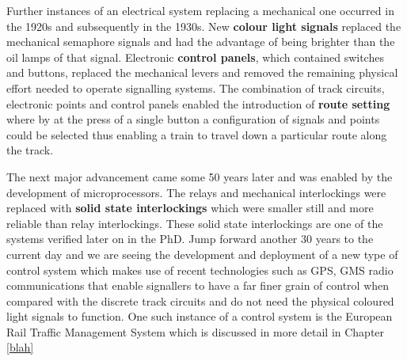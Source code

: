 Further instances of an electrical system replacing a mechanical one occurred in the 1920s and subsequently in the 1930s. New \textbf{colour light signals} replaced  the mechanical semaphore signals and had the advantage of being brighter than the oil lamps of that signal.
Electronic \textbf{control panels}, which contained switches and buttons, replaced the mechanical levers and removed the remaining physical effort needed to operate signalling systems. The combination of track circuits, electronic points and control panels enabled the introduction of \textbf{route setting} where by at the press of a single button a configuration of signals and points could be selected thus enabling a train to travel down a particular route along the track.

The next major advancement came some 50 years later and was enabled by the development of microprocessors. The relays and mechanical interlockings were replaced with \textbf{solid state interlockings} which were smaller still and more reliable than relay interlockings.
These solid state interlockings are one of the systems verified later on in the PhD. Jump forward another 30 years to the current day and we are seeing the development and deployment of a new type of control system which makes use of recent technologies such as GPS, GMS radio  communications that enable signallers to have a far finer grain of control when compared with the discrete track circuits and do not need the physical coloured light signals to function. One such instance of a control system is the European Rail Traffic Management System which is discussed in more detail in Chapter \ref{blah}
\begin{comment}
In the 1920s \textbf{colour light signals} replaced mechanical semaphore signals these where much brighter than the oil
lamps fitted to semaphores and greatly increased the safety of night time
train travel. In the 1930s the mechanical levers were replaced with an electronic \textbf{control panel}
containing switches and buttons. This allowed for the introduction of
\textbf{route setting} where with the press of a button configurations of signals and points would be
associated with a particular route could become activated. Prior to this time
many levers would have had to have been pulled to set many different pieces of equipment.
During the 1980s the most important advance from our point of view took
place. The advent of electronic microprocessors enabled the replacement of the
relay and mechanical interlockings with an electronic \textbf{solid state interlocking}
system (SSI) \cite{AC08}. The main focus of this project will be to investigate the safety
of such solid state interlockings.
\end{comment}
